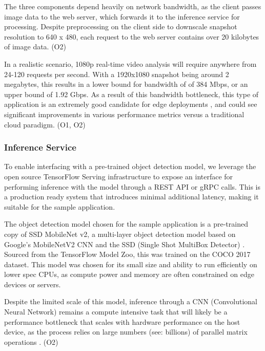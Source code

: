 \documentclass[11pt]{article}
\begin{document}
The three components depend heavily on network bandwidth, as the client passes image data to the
web server, which forwards it to the inference service for processing. Despite preprocessing on the 
client side to downscale snapshot resolution to 640 x 480, each request to the web server contains 
over 20 kilobytes of image data. (O2) \newline

In a realistic scenario, 1080p real-time video analysis will require anywhere from 24-120 requests 
per second. With a 1920x1080 snapshot being around 2 megabytes, this results in a lower bound for 
bandwidth of of 384 Mbps, or an upper bound of 1.92 Gbps. As a result of this bandwidth bottleneck,
this type of application is an extremely good candidate for edge deployments \cite{7488250}, and could see 
significant improvements in various performance metrics versus a traditional cloud paradigm. (O1, O2)

\subsubsection{Inference Service}
To enable interfacing with a pre-trained object detection model, we leverage the open source
TensorFlow Serving infrastructure to expose an interface for performing inference with the model 
through a REST API or gRPC calls. This is a production ready system that introduces minimal
additional latency, making it suitable for the sample application.\newline

The object detection model chosen for the sample application is a pre-trained copy of SSD 
MobileNet v2, a multi-layer object detection model based on Google's MobileNetV2 CNN \cite{sandler_mobilenetv2_2019} and the SSD 
(Single Shot MultiBox Detector) \cite{liu_ssd_2016}. Sourced from the TensorFlow Model Zoo, this was trained on the 
COCO 2017 dataset. This model was chosen for its small size and ability to run efficiently on lower
spec CPUs, as compute power and memory are often constrained on edge devices or servers.
\newline

Despite the limited scale of this model, inference through a CNN (Convolutional Neural Network) 
remains a compute intensive task that will likely be a performance bottleneck that scales with 
hardware performance on the host device, as the process relies on large numbers (see: billions) 
of parallel matrix operations \cite{copeland_whats_2016}. (O2)\newline
\end{document}
